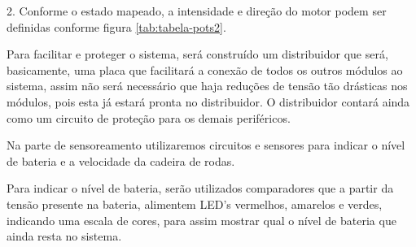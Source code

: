 2. Conforme o estado mapeado, a intensidade e direção do motor podem ser definidas conforme figura \ref{tab:tabela-pots2}.

\begin{table}[!ht]
\centering
{}
\caption{Intesidade e direção dos motores conforme estado. Asteriscos simbolizam motor sem direção}
\label{tab:tabela-pots2}
\end{table}

Para facilitar e proteger o sistema, será construído um distribuidor que será, basicamente, uma placa que facilitará a conexão de todos os outros módulos ao sistema, assim não será necessário que haja reduções de tensão tão drásticas nos módulos, pois esta já estará pronta no distribuidor. O distribuidor contará ainda como um circuito de proteção para os demais periféricos.

Na parte de sensoreamento utilizaremos circuitos e sensores para indicar o nível de bateria e a velocidade da cadeira de rodas.

Para indicar o nível de bateria, serão utilizados comparadores que a partir da tensão presente na bateria, alimentem LED's vermelhos, amarelos e verdes, indicando uma escala de cores, para assim mostrar qual o nível de bateria que ainda resta no sistema.

